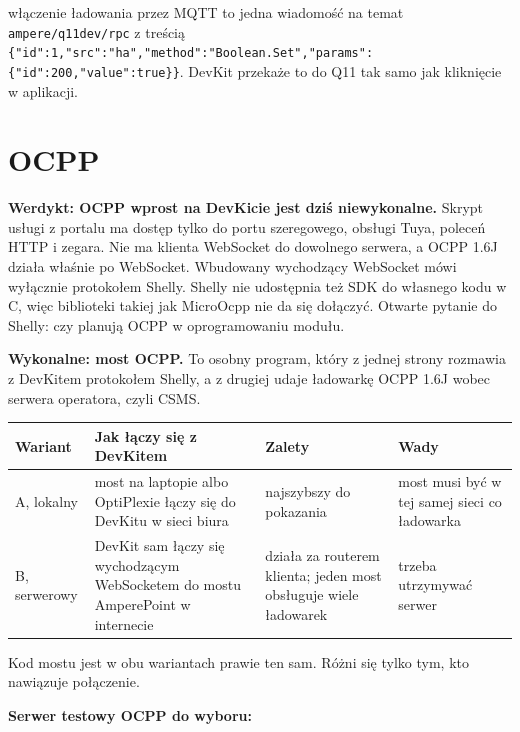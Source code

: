\documentclass[11pt,a4paper]{article}
\begin{document}
\begin{przyklad}[{Przykład}]
włączenie ładowania przez MQTT to jedna wiadomość na temat \texttt{ampere/\allowbreak{}q11dev/\allowbreak{}rpc} z treścią \texttt{\{"id":\allowbreak{}1,"src":\allowbreak{}"ha","method":\allowbreak{}"Boolean.\allowbreak{}Set","params":\allowbreak{}\{"id":\allowbreak{}200,"value":\allowbreak{}true\}\}}. DevKit przekaże to do Q11 tak samo jak kliknięcie w aplikacji.
\end{przyklad}

\section{OCPP}

\textbf{Werdykt: OCPP wprost na DevKicie jest dziś niewykonalne.} Skrypt usługi z portalu ma dostęp tylko do portu szeregowego, obsługi Tuya, poleceń HTTP i zegara. Nie ma klienta WebSocket do dowolnego serwera, a OCPP 1.6J działa właśnie po WebSocket. Wbudowany wychodzący WebSocket mówi wyłącznie protokołem Shelly. Shelly nie udostępnia też SDK do własnego kodu w C, więc biblioteki takiej jak MicroOcpp nie da się dołączyć. Otwarte pytanie do Shelly: czy planują OCPP w oprogramowaniu modułu.


\textbf{Wykonalne: most OCPP.} To osobny program, który z jednej strony rozmawia z DevKitem protokołem Shelly, a z drugiej udaje ładowarkę OCPP 1.6J wobec serwera operatora, czyli CSMS.


\begin{longtable}{>{\raggedright\arraybackslash}p{3.00cm}>{\raggedright\arraybackslash}p{5.99cm}>{\raggedright\arraybackslash}p{3.30cm}>{\raggedright\arraybackslash}p{2.55cm}}
\toprule
\rowcolor{apteallight}\textbf{Wariant} & \textbf{Jak łączy się z DevKitem} & \textbf{Zalety} & \textbf{Wady} \\
\midrule\endhead
\bottomrule\endfoot
A, lokalny & most na laptopie albo OptiPlexie łączy się do DevKitu w sieci biura & najszybszy do pokazania & most musi być w tej samej sieci co ładowarka \\
B, serwerowy & DevKit sam łączy się wychodzącym WebSocketem do mostu AmperePoint w internecie & działa za routerem klienta; jeden most obsługuje wiele ładowarek & trzeba utrzymywać serwer \\
\end{longtable}

Kod mostu jest w obu wariantach prawie ten sam. Różni się tylko tym, kto nawiązuje połączenie.


\textbf{Serwer testowy OCPP do wyboru:}
\end{document}
